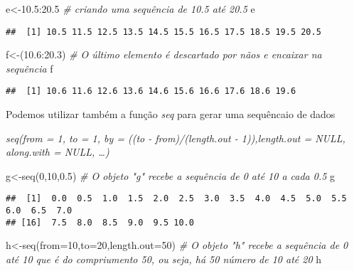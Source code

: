 \documentclass[
]{book}
\newenvironment{Shaded}{\begin{snugshade}}{\end{snugshade}}
\newcommand{\AttributeTok}[1]{\textcolor[rgb]{0.77,0.63,0.00}{#1}}
\newcommand{\CommentTok}[1]{\textcolor[rgb]{0.56,0.35,0.01}{\textit{#1}}}
\newcommand{\DecValTok}[1]{\textcolor[rgb]{0.00,0.00,0.81}{#1}}
\newcommand{\FloatTok}[1]{\textcolor[rgb]{0.00,0.00,0.81}{#1}}
\newcommand{\FunctionTok}[1]{\textcolor[rgb]{0.00,0.00,0.00}{#1}}
\newcommand{\NormalTok}[1]{#1}
\newcommand{\OtherTok}[1]{\textcolor[rgb]{0.56,0.35,0.01}{#1}}
\newcommand{\SpecialCharTok}[1]{\textcolor[rgb]{0.00,0.00,0.00}{#1}}
\begin{document}
\begin{Shaded}
\begin{Highlighting}[]
\NormalTok{e}\OtherTok{\textless{}{-}}\FloatTok{10.5}\SpecialCharTok{:}\FloatTok{20.5} \CommentTok{\# criando uma sequência de 10.5 até 20.5}
\NormalTok{e}
\end{Highlighting}
\end{Shaded}

\begin{verbatim}
##  [1] 10.5 11.5 12.5 13.5 14.5 15.5 16.5 17.5 18.5 19.5 20.5
\end{verbatim}

\begin{Shaded}
\begin{Highlighting}[]
\NormalTok{f}\OtherTok{\textless{}{-}}\NormalTok{(}\FloatTok{10.6}\SpecialCharTok{:}\FloatTok{20.3}\NormalTok{) }\CommentTok{\# O último elemento é descartado por nãos e encaixar na sequência}
\NormalTok{f}
\end{Highlighting}
\end{Shaded}

\begin{verbatim}
##  [1] 10.6 11.6 12.6 13.6 14.6 15.6 16.6 17.6 18.6 19.6
\end{verbatim}

Podemos utilizar também a função \emph{seq} para gerar uma sequêncaio de dados

\emph{\emph{seq(from = 1, to = 1, by = ((to - from)/(length.out - 1)),length.out = NULL, along.with = NULL, \ldots)}}

\begin{Shaded}
\begin{Highlighting}[]
\NormalTok{g}\OtherTok{\textless{}{-}}\FunctionTok{seq}\NormalTok{(}\DecValTok{0}\NormalTok{,}\DecValTok{10}\NormalTok{,}\FloatTok{0.5}\NormalTok{) }\CommentTok{\# O objeto "g" recebe a sequência de 0 até 10 a cada 0.5}
\NormalTok{g}
\end{Highlighting}
\end{Shaded}

\begin{verbatim}
##  [1]  0.0  0.5  1.0  1.5  2.0  2.5  3.0  3.5  4.0  4.5  5.0  5.5  6.0  6.5  7.0
## [16]  7.5  8.0  8.5  9.0  9.5 10.0
\end{verbatim}

\begin{Shaded}
\begin{Highlighting}[]
\NormalTok{h}\OtherTok{\textless{}{-}}\FunctionTok{seq}\NormalTok{(}\AttributeTok{from=}\DecValTok{10}\NormalTok{,}\AttributeTok{to=}\DecValTok{20}\NormalTok{,}\AttributeTok{length.out=}\DecValTok{50}\NormalTok{) }\CommentTok{\# O objeto "h" recebe a sequência de 0 até 10 que é do compriumento 50, ou seja, há 50 número de 10 até 20}
\NormalTok{h}
\end{Highlighting}
\end{Shaded}
\end{document}
